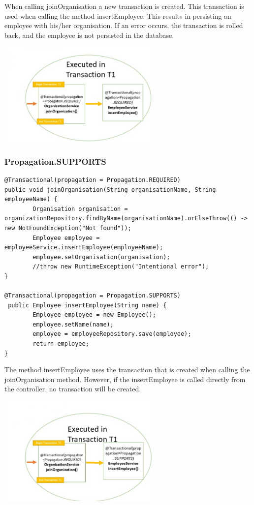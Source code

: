 When calling joinOrganisation a new transaction is created. This transaction is used when calling the method insertEmployee. This results in persisting an employee with his/her organisation. If an error occurs, the transaction is rolled back, and the employee is not persisted in the database. 

\includegraphics[width=8cm]{./images/jpa/transaction_propagation_1}


\subsubsection{Propagation.SUPPORTS}

\begin{lstlisting}
@Transactional(propagation = Propagation.REQUIRED)
public void joinOrganisation(String organisationName, String employeeName) {
        Organisation organisation = organizationRepository.findByName(organisationName).orElseThrow(() -> new NotFoundException("Not found"));
        Employee employee = employeeService.insertEmployee(employeeName);
        employee.setOrganisation(organisation);
        //throw new RuntimeException("Intentional error");
}

@Transactional(propagation = Propagation.SUPPORTS)
 public Employee insertEmployee(String name) {
        Employee employee = new Employee();
        employee.setName(name);
        employee = employeeRepository.save(employee);
        return employee;
}
\end{lstlisting}

The method insertEmployee uses the transaction that is created when calling the joinOrganisation method. However, if the insertEmployee is called directly from the controller, no transaction will be created.

\includegraphics[width=8cm]{./images/jpa/transaction_propagation_2}

